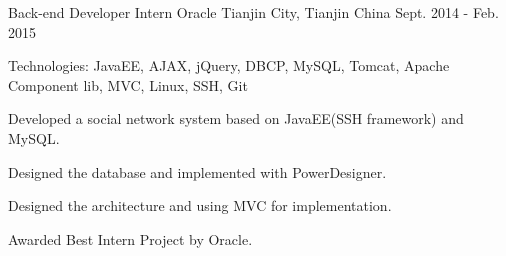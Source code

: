 \begin{cventries}
  \cventry
    {Back-end Developer Intern}
    {Oracle}
    {Tianjin City, Tianjin China}
    {Sept. 2014 - Feb. 2015}
    {
      \begin{cvitems}
        \item {Technologies: JavaEE, AJAX, jQuery, DBCP, MySQL, Tomcat, Apache Component lib, MVC, Linux, SSH, Git}
        \item {Developed a social network system based on JavaEE(SSH framework) and MySQL.}
        \item {Designed the database and implemented with PowerDesigner.}
        \item {Designed the architecture and using MVC for implementation.}
        \item {Awarded Best Intern Project by Oracle.}
      \end{cvitems} 
    }
\end{cventries}
